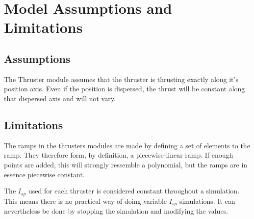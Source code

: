 \section{Model Assumptions and Limitations}

\subsection{Assumptions}

The Thruster module assumes that the thruster is thrusting exactly along it's position axis. Even if the position is dispersed, the thrust will be constant along that dispersed axis and will not vary.

\subsection{Limitations}

The ramps in the thrusters modules are made by defining a set of elements to the ramp. They therefore form, by definition, a piecewise-linear ramp. If enough points are added, this will strongly ressemble a polynomial, but the ramps are in essence piecewise constant.

The $I_{sp}$ used for each thruster is considered constant throughout a simulation. This means there is no practical way of doing variable $I_{sp}$ simulations. It can nevertheless be done by stopping the simulation and modifying the values.